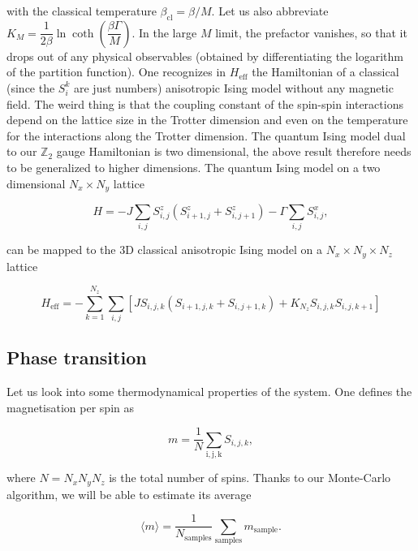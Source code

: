 \documentclass[11pt,openany]{article}
\begin{document}
with the classical temperature $\beta_\mathrm{cl} = \beta/M$. Let us also abbreviate $K_M = \dfrac{1}{2\beta}\ln\coth\left(\dfrac{\beta\Gamma}{M}\right)$. In the large $M$ limit, the prefactor vanishes, so that it drops out of any physical observables (obtained by differentiating the logarithm of the partition function). One recognizes in $H_\mathrm{eff}$ the Hamiltonian of a classical (since the $S_i^k$ are just numbers) anisotropic Ising model without any magnetic field. The weird thing is that the coupling constant of the spin-spin interactions depend on the lattice size in the  Trotter dimension and even on the temperature for the interactions along the Trotter dimension. The quantum Ising model dual to our $\mathds{Z}_2$ gauge Hamiltonian is two dimensional, the above result therefore needs to be generalized to higher dimensions. The quantum Ising model on a two dimensional $N_x\times N_y$ lattice

\begin{equation}
	H = -J\sum_{i,j}S^z_{i,j}\left(S^z_{i+1,j} + S^z_{i,j+1}\right) -\Gamma\sum_{i,j}S^x_{i,j},
\end{equation}

can be mapped to the 3D classical anisotropic Ising model on a $N_x\times N_y \times N_z$ lattice

\begin{equation}
	H_\mathrm{eff} = -\sum_{k=1}^{N_z}\sum_{i,j}\left[J S_{i,j,k}\left(S_{i+1,j,k} + S_{i,j+1,k}\right) + K_{N_z} S_{i,j,k}S_{i,j,k+1}\right]
\end{equation}


\subsection{Phase transition}

Let us look into some thermodynamical properties of the system. One defines the magnetisation per spin as

\begin{equation}
	m = \frac{1}{N}\sum_\mathrm{i,j,k}S_{i,j,k},
\end{equation}

where $N=N_xN_yN_z$ is the total number of spins. Thanks to our Monte-Carlo algorithm, we will be able to estimate its average

\begin{equation}
	\langle m\rangle = \frac{1}{N_\mathrm{samples}}\sum_\mathrm{samples} m_\mathrm{sample}.
\end{equation}
\end{document}

